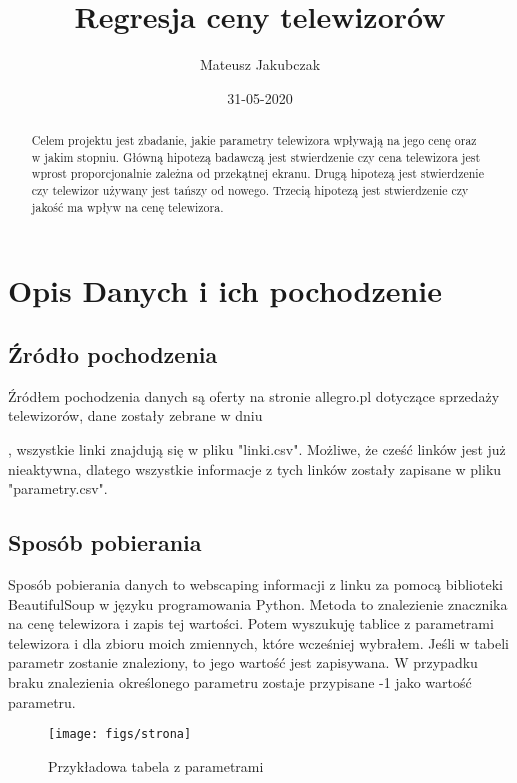 \documentclass[11pt,a4paper]{article}
\title{Regresja ceny telewizorów}
\author{Mateusz Jakubczak}
\affil{Wydział Zarządzania, Akademia Górniczo-Hutnicza im. Stanisława Staszica w Krakowie}
\affil{II rok Informatyka i Ekonometria }
\begin{document}
\maketitle

\begin{abstract}
	Celem projektu jest zbadanie, jakie parametry telewizora wpływają na jego cenę oraz w jakim stopniu.
	Główną hipotezą badawczą jest stwierdzenie czy cena telewizora jest wprost proporcjonalnie zależna od przekątnej ekranu. 
	Drugą hipotezą jest stwierdzenie czy telewizor używany jest tańszy od nowego.
	Trzecią hipotezą jest stwierdzenie czy jakość ma wpływ na cenę telewizora.
	
\end{abstract}
\newpage

\tableofcontents
\newpage

\section{Opis Danych i ich pochodzenie}

	\subsection{Źródło pochodzenia}
	     Źródłem pochodzenia danych są oferty na stronie allegro.pl dotyczące sprzedaży telewizorów,
		 dane zostały zebrane w dniu \date{31-05-2020}, wszystkie linki znajdują się w pliku "linki.csv".
		 Możliwe, że cześć linków jest już nieaktywna, dlatego wszystkie informacje z tych linków zostały zapisane w pliku 
		 "parametry.csv".
		 
	\subsection{Sposób pobierania}
		Sposób pobierania danych to webscaping informacji z linku za pomocą biblioteki  
		BeautifulSoup w języku programowania Python. Metoda to znalezienie znacznika na cenę telewizora i zapis tej wartości. 
		Potem wyszukuję tablice z parametrami telewizora i dla zbioru moich zmiennych, które wcześniej wybrałem. Jeśli w 
		tabeli parametr zostanie znaleziony, to jego wartość jest zapisywana. W przypadku braku znalezienia określonego parametru zostaje przypisane -1 jako wartość parametru. 
		\begin{figure}[h]
			\centering
			\texttt{[image: figs/strona]}
			\caption[Przykładowa tabela z parametrami]{Przykładowa tabela z parametrami}
			\label{fig:strona}
		\end{figure}
	
\end{document}
